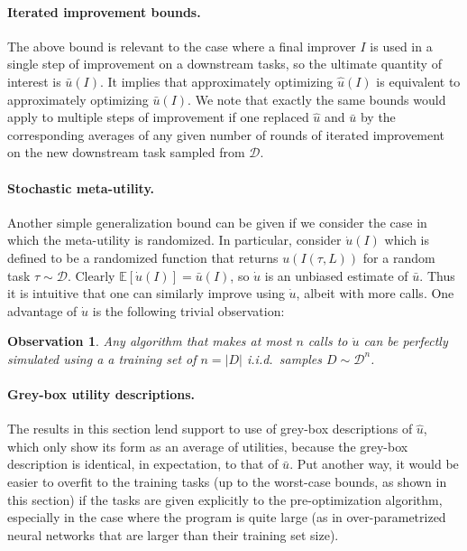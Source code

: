 \documentclass{article} %
\newtheorem{observation}{Observation}
\newcommand{\E}{\mathbb{E}}
\newcommand{\metautil}{{\hat{u}}}
\newcommand{\exputil}{{\bar{u}}}
\newcommand{\randutil}{{\dot{u}}}
\newcommand{\D}{{\mathcal{D}}}
\begin{document}
\paragraph{Iterated improvement bounds.} The above bound is relevant to the case where a final improver $I$ is used in a single step of improvement on a downstream tasks, so the ultimate quantity of interest is $\exputil(I)$. It implies that approximately optimizing $\metautil(I)$ is equivalent to approximately optimizing $\exputil(I)$. We note that exactly the same bounds would apply to multiple steps of improvement if one replaced $\metautil$ and $\exputil$ by the corresponding averages of any given number of rounds of iterated improvement on the new downstream task sampled from $\D$. 

\paragraph{Stochastic meta-utility.} Another simple generalization bound can be given if we consider the case in which the meta-utility is randomized. In particular, consider $\randutil(I)$ which is defined to be a randomized function that returns $u(I(\tau, L))$ for a random task $\tau \sim \D$. Clearly $\E[\randutil(I)]=\exputil(I)$, so $\randutil$ is an unbiased estimate of $\exputil$. Thus it is intuitive that one can similarly improve using $\randutil$, albeit with more calls. One advantage of $\randutil$ is the following trivial observation:
\begin{observation}
    Any algorithm that makes at most $n$ calls to $\randutil$ can be perfectly simulated using a a training set of $n=|D|$ i.i.d.\ samples $D \sim \D^n$.
\end{observation}

\paragraph{Grey-box utility descriptions.} The results in this section lend support to use of grey-box descriptions of $\metautil$, which only show its form as an average of utilities, because the grey-box description is identical, in expectation, to that of $\exputil$. Put another way, it would be easier to overfit to the training tasks (up to the worst-case bounds, as shown in this section) if the tasks are given explicitly to the pre-optimization algorithm, especially in the case where the program is quite large (as in over-parametrized neural networks that are larger than their training set size).
\end{document}
